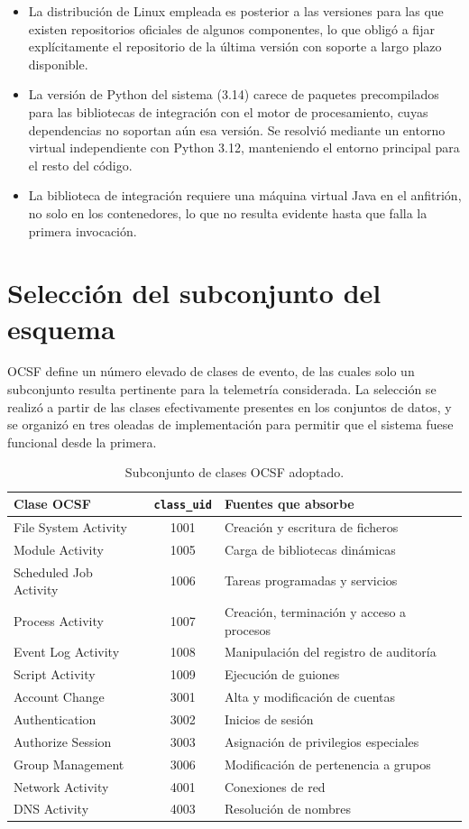 \begin{itemize}
    \item La distribución de Linux empleada es posterior a las versiones para las que existen
    repositorios oficiales de algunos componentes, lo que obligó a fijar explícitamente el
    repositorio de la última versión con soporte a largo plazo disponible.
    \item La versión de Python del sistema (3.14) carece de paquetes precompilados para las
    bibliotecas de integración con el motor de procesamiento, cuyas dependencias no soportan
    aún esa versión. Se resolvió mediante un entorno virtual independiente con Python 3.12,
    manteniendo el entorno principal para el resto del código.
    \item La biblioteca de integración requiere una máquina virtual Java en el anfitrión, no
    solo en los contenedores, lo que no resulta evidente hasta que falla la primera
    invocación.
\end{itemize}

\section{Selección del subconjunto del esquema}

OCSF define un número elevado de clases de evento, de las cuales solo un subconjunto resulta
pertinente para la telemetría considerada. La selección se realizó a partir de las clases
efectivamente presentes en los conjuntos de datos, y se organizó en tres oleadas de
implementación para permitir que el sistema fuese funcional desde la primera.

\begin{table}[H]
\centering
\begin{tabular}{|l|c|l|}
\hline
\textbf{Clase OCSF} & \textbf{\texttt{class\_uid}} & \textbf{Fuentes que absorbe} \\
\hline
File System Activity & 1001 & Creación y escritura de ficheros \\
Module Activity & 1005 & Carga de bibliotecas dinámicas \\
Scheduled Job Activity & 1006 & Tareas programadas y servicios \\
Process Activity & 1007 & Creación, terminación y acceso a procesos \\
Event Log Activity & 1008 & Manipulación del registro de auditoría \\
Script Activity & 1009 & Ejecución de guiones \\
Account Change & 3001 & Alta y modificación de cuentas \\
Authentication & 3002 & Inicios de sesión \\
Authorize Session & 3003 & Asignación de privilegios especiales \\
Group Management & 3006 & Modificación de pertenencia a grupos \\
Network Activity & 4001 & Conexiones de red \\
DNS Activity & 4003 & Resolución de nombres \\
\hline
\end{tabular}
\caption{Subconjunto de clases OCSF adoptado.}
\label{tab:ocsf}
\end{table}

